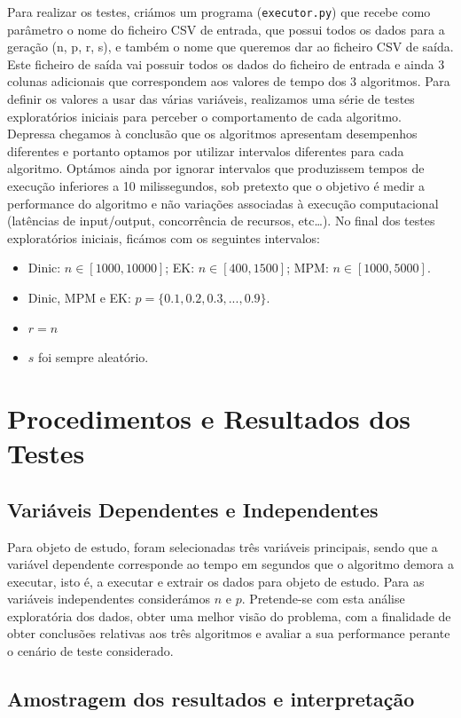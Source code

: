 \documentclass{uofa-eng-assignment}
\begin{document}
Para realizar os testes, criámos um programa (\texttt{executor.py}) que recebe como parâmetro o nome do ficheiro CSV de entrada, que possui todos os dados para a geração (n, p, r, s), e também o nome que queremos dar ao ficheiro CSV de saída. Este ficheiro de saída vai possuir todos os dados do ficheiro de entrada e ainda 3 colunas adicionais que correspondem aos valores de tempo dos 3 algoritmos. 
Para definir os valores a usar das várias variáveis, realizamos uma série de testes exploratórios iniciais para perceber o comportamento de cada algoritmo. Depressa chegamos à conclusão que os algoritmos apresentam desempenhos diferentes e portanto optamos por utilizar intervalos diferentes para cada algoritmo. Optámos ainda por ignorar intervalos que produzissem tempos de execução inferiores a 10 milissegundos, sob pretexto que o objetivo é medir a performance do algoritmo e não variações associadas à execução computacional (latências de input/output, concorrência de recursos, etc…).
No final dos testes exploratórios iniciais, ficámos com os seguintes intervalos:
\begin{itemize}
\item Dinic: $n\in[1000,10000]$; EK: $n\in[400,1500]$; MPM: $n\in[1000,5000]$. 
\item Dinic, MPM e EK: $p=\{0.1, 0.2, 0.3, ..., 0.9\}$.
\item $r=n$
\item $s$ foi sempre aleatório.
\end{itemize}

\section{Procedimentos e Resultados dos Testes }
\subsection{Variáveis Dependentes e Independentes }

Para objeto de estudo, foram selecionadas três variáveis principais, sendo que a variável dependente corresponde ao tempo em segundos que o algoritmo demora a executar, isto é, a executar e extrair os dados para objeto de estudo. Para as variáveis independentes considerámos $n$ e $p$.
Pretende-se com esta análise exploratória dos dados, obter uma melhor visão do problema, com a finalidade de obter conclusões relativas aos três algoritmos e avaliar a sua performance perante o cenário de teste considerado.

\subsection{Amostragem dos resultados e interpretação }
\end{document}
